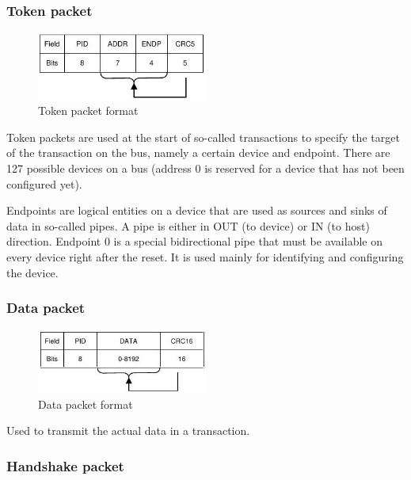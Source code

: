 \documentclass{article}
\begin{document}
\subsubsection{Token packet}

\begin{figure}[H]
  \caption{Token packet format \cite[p. 199]{usbstd}}
  \centering
  \includegraphics[width=0.5\textwidth]{images/token_packet.jpg}
\end{figure}

Token packets are used at the start of so-called transactions to specify the target
of the transaction on the bus, namely a certain device and endpoint. There are 127
possible devices on a bus (address 0 is reserved for a device that has not been configured yet).
\cite[p. 256]{usbstd}

Endpoints are logical entities on a device that are used as sources and sinks of data
in so-called pipes. A pipe is either in OUT (to device) or IN (to host) direction.
Endpoint 0 is a special bidirectional pipe that must be available on every device
right after the reset. It is used mainly for identifying and configuring the device.
\cite[p. 33]{usbstd}

\subsubsection{Data packet}

\begin{figure}[H]
  \caption{Data packet format \cite[p. 206]{usbstd}}
  \centering
  \includegraphics[width=0.5\textwidth]{images/data_packet.jpg}
\end{figure}

Used to transmit the actual data in a transaction.

\subsubsection{Handshake packet}
\end{document}
